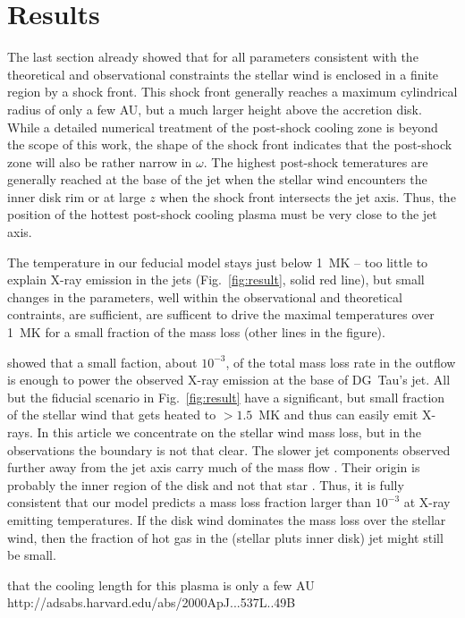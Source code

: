 \section{Results}
\label{sect:results}
The last section already showed that for all parameters consistent with the theoretical and observational constraints the stellar wind is enclosed in a finite region by a shock front. This shock front generally reaches a maximum cylindrical radius of only a few AU, but a much larger height above the accretion disk. While a detailed numerical treatment of the post-shock cooling zone is beyond the scope of this work, the shape of the shock front indicates that the post-shock zone will also be rather narrow in $\omega$. The highest post-shock temeratures are generally reached at the base of the jet when the stellar wind encounters the inner disk rim or at large $z$ when the shock front intersects the jet axis. Thus, the position of the hottest post-shock cooling plasma must be very close to the jet axis. 

The temperature in our feducial model stays just below 1~MK -- too little to explain X-ray emission in the jets (Fig.~\ref{fig:result}, solid red line), but small changes in the parameters, well within the observational and theoretical contraints,  are sufficient, are sufficent to drive the maximal temperatures over 1~MK for a small fraction of the mass loss (other lines in the figure). 

\citet{2009A&A...493..579G} showed that a small faction, about $10^{-3}$, of the total mass loss rate in the outflow is enough to power the observed X-ray emission at the base of DG~Tau's jet. All but the fiducial scenario in Fig.~\ref{fig:result} have a significant, but small fraction of the stellar wind that gets heated to $>1.5$~MK and thus can easily emit X-rays. In this article we concentrate on the stellar wind mass loss, but in the observations the boundary is not that clear. The slower jet components observed further away from the jet axis carry much of the mass flow \citep{2000ApJ...537L..49B}. Their origin is probably the inner region of the disk and not that star \citep{2003ApJ...590L.107A}. Thus, it is fully consistent that our model predicts a mass loss fraction larger than  $10^{-3}$ at X-ray emitting temperatures. If the disk wind dominates the mass loss over the stellar wind, then the fraction of hot gas in the (stellar pluts inner disk) jet might still be small.

that the cooling length for this plasma is only a few AU 
http://adsabs.harvard.edu/abs/2000ApJ...537L..49B